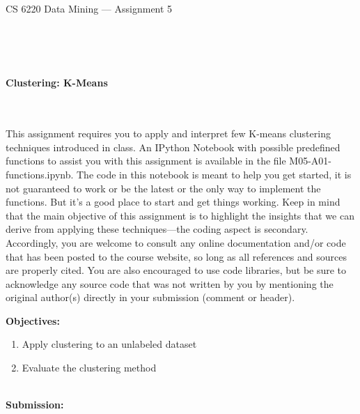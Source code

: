 \documentclass[letter-paper,12pt]{article} %
\begin{document}

\begin{center}
\begin{Large}
CS 6220 Data Mining --- Assignment 5
\end{Large}
\end{center}

\hline
\hline
~\\~\\~\\

\begin{center}
\begin{Large}
\textbf{Clustering: K-Means}
\end{Large}
\end{center}
~\\~\\

This assignment requires you to apply and interpret few K-means clustering techniques introduced in class. An IPython Notebook with possible predefined functions to assist you with this assignment is available in the file M05-A01-functions.ipynb. The code in this notebook is meant to help you get started, it is not guaranteed to work or be the latest or the only way to implement the functions. But it's a good place to start and get things working.  Keep in mind that the main objective of this assignment is to highlight the insights that we can derive from applying these techniques—the coding aspect is secondary. Accordingly, you are welcome to consult any online documentation and/or code that has been posted to the course website, so long as all references and sources are properly cited. You are also encouraged to use code libraries, but be sure to acknowledge any source code that was not written by you by mentioning the original author(s) directly in your submission (comment or header).\

\textbf{Objectives:}
\begin{enumerate}
    \item Apply clustering to an unlabeled dataset
    \item Evaluate the clustering method
\end{enumerate}
~\\

\textbf{Submission:}\\
\end{document}
